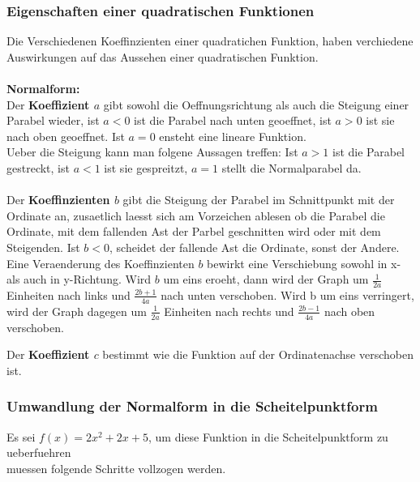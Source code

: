 \documentclass[a4paper]{article} %
\begin{document}
	\subsubsection{Eigenschaften einer quadratischen Funktionen}
	Die Verschiedenen Koeffinzienten einer quadratichen Funktion, haben verchiedene Auswirkungen auf das Aussehen einer
	quadratischen Funktion.\\
	\\ \textbf{Normalform:}\\
	Der \textbf{Koeffizient $a$} gibt sowohl die Oeffnungsrichtung als auch die Steigung einer Parabel wieder, ist $a < 0$ ist die Parabel nach unten geoeffnet, ist $a > 0$ ist sie nach oben geoeffnet. Ist $a = 0$ ensteht eine lineare Funktion.\texttt{}\\
	Ueber die Steigung kann man folgene Aussagen treffen: Ist $a > 1$ ist die Parabel gestreckt, ist $a<1$ ist sie gespreitzt, $a=1$ stellt die Normalparabel da.
	\\\\Der \textbf{Koeffinzienten $b$} gibt die Steigung der Parabel im Schnittpunkt mit der Ordinate an, zusaetlich laesst sich am Vorzeichen ablesen
	ob die Parabel die Ordinate, mit dem fallenden Ast der Parbel geschnitten wird oder mit dem Steigenden.
	Ist $b < 0$, scheidet der fallende Ast die Ordinate, sonst der Andere.
	Eine Veraenderung des Koeffinzienten $b$ bewirkt eine Verschiebung sowohl in x- als auch in y-Richtung. Wird $b$ um eins eroeht, dann wird der Graph um $\frac{1}{2a}$ Einheiten nach links und $\frac{2b+1}{4a}$ nach unten verschoben. Wird b um eins verringert, wird der Graph dagegen um $\frac{1}{2a}$ Einheiten nach rechts und $\frac{2b-1}{4a}$ nach oben verschoben.
	
	

	\hspace{-1.5 cm}
	Der \textbf{Koeffizient $c$} bestimmt wie die Funktion auf der Ordinatenachse verschoben ist.


	\subsubsection{Umwandlung der Normalform in die Scheitelpunktform}
	
		Es sei $f(x)=2x^2+2x+5$, um diese Funktion in die Scheitelpunktform zu ueberfuehren\\ muessen folgende Schritte vollzogen werden.
		
\end{document}
